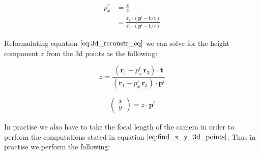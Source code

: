 \documentclass{paper}
\begin{document}
\begin{align}
    p^{r}_{x} 
    &= \frac{x}{z} \\
    &= \frac{\mathbf{r}_{1} \cdot (\textbf{p}^{l} - \mathbf{t}/z)}{\mathbf{r}_{3} \cdot (\textbf{p}^{l} - \mathbf{t}/z)}  
\end{align}


Reformulating equation $\ref{eq:3d_reconstr_eq}$ we can solve for the height component $z$ from the 3d points as the following:

\begin{equation}
    z =  \frac{ (\mathbf{r}_{1} - p^{r}_{x} \, \mathbf{r}_{3}) \cdot \mathbf{t} }{ (\mathbf{r}_{1} - p^{r}_{x} \, \mathbf{r}_{3}) \cdot \textbf{p}^{l} }
\end{equation}


\begin{align}
\begin{pmatrix} x \\ y \end{pmatrix} = z \cdot \textbf{p}^{l}
\label{eq:find_x_y_3d_points}
\end{align}


In practise we also have to take the focal length of the camera in order to perform the computations stated in equation $\ref{eq:find_x_y_3d_points}$. Thus in practise we perform the following:



     
\end{document}
